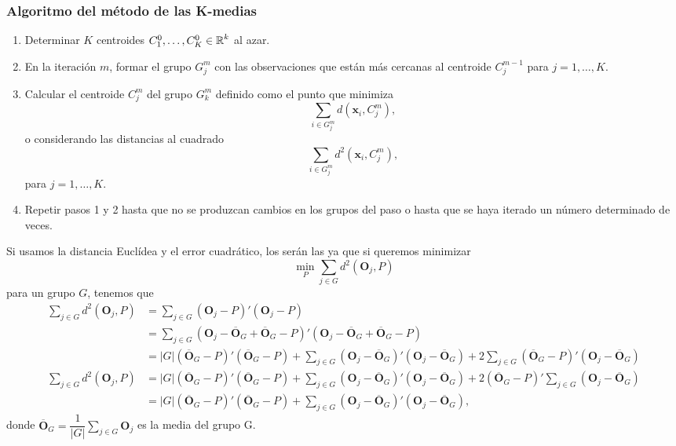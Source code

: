\subsubsection{Algoritmo del método de las K-medias}
\begin{enumerate}[label=\textbullet \hspace{5pt}\lb{Paso \arabic*:}, leftmargin=2cm, start=0]
\item Determinar $K$ centroides $C_1^0,\dots,C_K^0\in\operatorname{\mathbb{R}}^k$ al azar.
\item En la iteración $m$, formar el grupo $G_j^m$ con las observaciones que están más cercanas al centroide $C_j^{m-1}$ para $j=1,\dots,K$.
\item Calcular el centroide $C_j^m$ del grupo $G_k^m$ definido como el punto que minimiza \[ \sum_{i\in G_j^m}d(\mathbf{x}_i,C_j^m), \]o considerando las distancias al cuadrado \[ \sum_{i\in G_j^m}d^2(\mathbf{x}_i,C_j^m), \]para $j=1,\dots,K$.
\item Repetir pasos 1 y 2 hasta que no se produzcan cambios en los grupos del paso  o hasta que se haya iterado un número determinado de veces.
\end{enumerate}
Si usamos la distancia Euclídea y el error cuadrático, los  serán las  ya que si queremos minimizar \[ \min_P\sum_{j\in G}d^2(\mathbf{O}_j,P) \] para un grupo $G$, tenemos que 
$$
\begin{aligned}
\sum_{j \in G}d^{2}(\mathbf{O}_{j},P)&=\sum_{j\in G}(\mathbf{O}_{j}-P)'(\mathbf{O}_{j}-P)\\
&=\sum_{j\in G}(\mathbf{O}_{j}-\overline{\mathbf{O}}_{G}+\overline{\mathbf{O}}_{G}-P)'(\mathbf{O}_{j}-\overline{\mathbf{O}}_{G}+\overline{\mathbf{O}}_{G}-P)\\
&=|G|(\overline{\mathbf{O}}_{G}-P)'(\overline{\mathbf{O}}_{G}-P)+\sum_{j\in G}(\mathbf{O}_{j}-\overline{\mathbf{O}}_{G})'(\mathbf{O}_{j}-\overline{\mathbf{O}}_{G})+2\sum_{j\in G}(\overline{\mathbf{O}}_{G}-P)'(\mathbf{O}_{j}-\overline{\mathbf{O}}_{G})\\
\sum_{j\in G}d^{2}(\mathbf{O}_{j},P)&=|G|(\overline{\mathbf{O}}_{G}-P)'(\overline{\mathbf{O}}_{G}-P)+\sum_{j\in G}(\mathbf{O}_{j}-\overline{\mathbf{O}}_{G})'(\mathbf{O}_{j}-\overline{\mathbf{O}}_{G})+2(\overline{\mathbf{O}}_{G}-P)'\sum_{j\in G}(\mathbf{O}_{j}-\overline{\mathbf{O}}_{G})\\
&=|G|(\overline{\mathbf{O}}_{G}-P)'(\overline{\mathbf{O}}_{G}-P)+\sum_{j\in G}(\mathbf{O}_{j}-\overline{\mathbf{O}}_{G})'(\mathbf{O}_{j}-\overline{\mathbf{O}}_{G}),
\end{aligned}
$$
donde $\overline{\mathbf{O}}_G=\dfrac{1}{|G|}\sum_{j\in G}\mathbf{O}_j$ es la media del grupo G.

